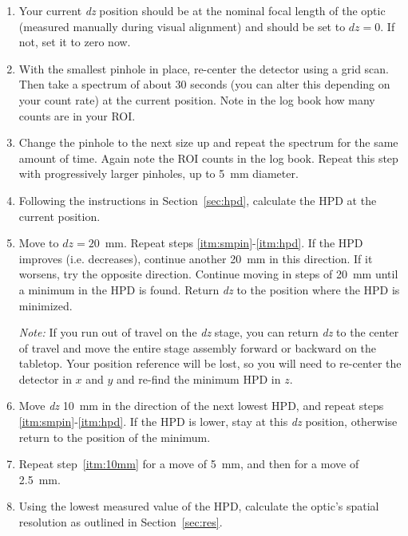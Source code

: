 \begin{enumerate}

\item Your current \textit{dz} position should be at the nominal focal length of
  the optic (measured manually during visual alignment) and should be set to
  $dz=0$. If not, set it to zero now.

\item \label{itm:smpin} With the smallest pinhole in place, re-center the
  detector using a grid scan. Then take a spectrum of about 30 seconds (you can
  alter this depending on your count rate) at the current position. Note in the
  log book how many counts are in your ROI.

\item \label{itm:nextpin} Change the pinhole to the next size up and repeat the
  spectrum for the same amount of time. Again note the ROI counts in the log
  book. Repeat this step with progressively larger pinholes, up to 5~mm
  diameter.

\item \label{itm:hpd} Following the instructions in Section~\ref{sec:hpd},
  calculate the HPD at the current position.

\item Move to $dz=20$~mm. Repeat steps \ref{itm:smpin}-\ref{itm:hpd}. If the HPD
  improves (i.e. decreases), continue another 20~mm in this direction. If it
  worsens, try the opposite direction. Continue moving in steps of 20~mm until a
  minimum in the HPD is found. Return \textit{dz} to the position where the HPD
  is minimized.

\textit{Note: }If you run out of travel on the \textit{dz} stage, you can return
\textit{dz} to the center of travel and move the entire stage assembly forward
or backward on the tabletop. Your position reference will be lost, so you will
need to re-center the detector in $x$ and $y$ and re-find the minimum HPD in
$z$.

\item \label{itm:10mm} Move \textit{dz} 10~mm in the direction of the next
  lowest HPD, and repeat steps \ref{itm:smpin}-\ref{itm:hpd}. If the HPD is
  lower, stay at this \textit{dz} position, otherwise return to the position of
  the minimum.

\item Repeat step~\ref{itm:10mm} for a move of 5~mm, and then for a move of
  2.5~mm.

\item Using the lowest measured value of the HPD, calculate the optic's spatial
  resolution as outlined in Section~\ref{sec:res}.

\end{enumerate}

